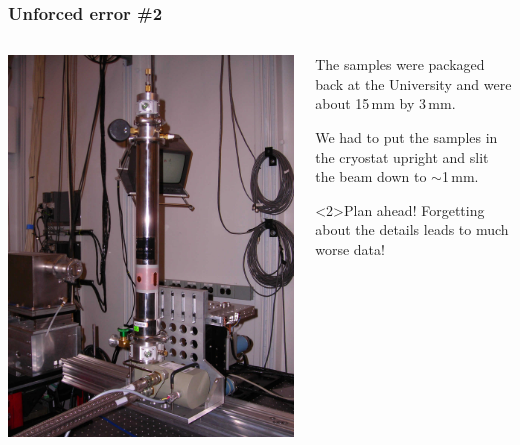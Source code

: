 \documentclass[10pt, xcolor=x11names, compress]{beamer}
\begin{document}
\begin{frame}
  \frametitle{Unforced error \#2}
  \begin{columns}
    \begin{column}{0.5\linewidth}
      \includegraphics[width=0.8\linewidth]{images/displex.jpg}
    \end{column}
    \begin{column}{0.5\linewidth}
      The samples were packaged back at the University and were about
      15\,mm by 3\,mm.

      \bigskip

      We had to put the samples in the cryostat upright and slit the
      beam down to $\sim$1\,mm.

      \bigskip

      \begin{alertblock}<2>{Plan ahead!}
        Forgetting about the details leads to much worse data!
      \end{alertblock}
    \end{column}
  \end{columns}
\end{frame}
\end{document}

